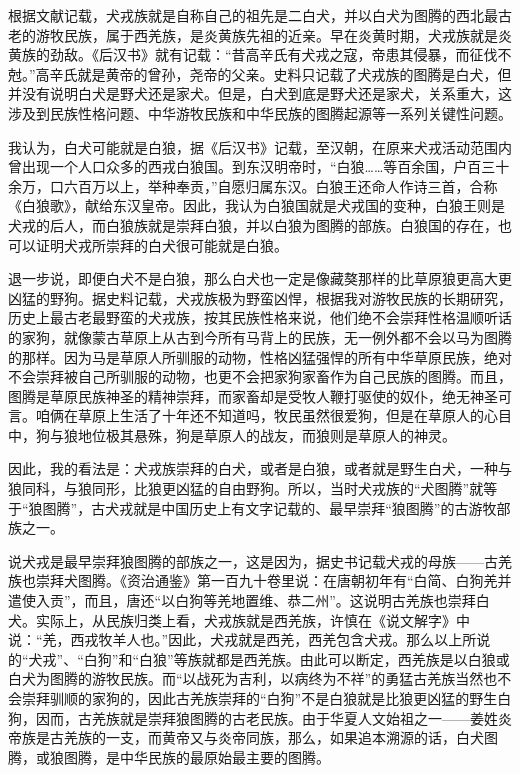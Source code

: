\par 根据文献记载，犬戎族就是自称自己的祖先是二白犬，并以白犬为图腾的西北最古老的游牧民族，属于西羌族，是炎黄族先祖的近亲。早在炎黄时期，犬戎族就是炎黄族的劲敌。《后汉书》就有记载：“昔高辛氏有犬戎之寇，帝患其侵暴，而征伐不尅。”高辛氏就是黄帝的曾孙，尧帝的父亲。史料只记载了犬戎族的图腾是白犬，但并没有说明白犬是野犬还是家犬。但是，白犬到底是野犬还是家犬，关系重大，这涉及到民族性格问题、中华游牧民族和中华民族的图腾起源等一系列关键性问题。
\par 我认为，白犬可能就是白狼，据《后汉书》记载，至汉朝，在原来犬戎活动范围内曾出现一个人口众多的西戎白狼国。到东汉明帝时，“白狼……等百余国，户百三十余万，口六百万以上，举种奉贡，”自愿归属东汉。白狼王还命人作诗三首，合称《白狼歌》，献给东汉皇帝。因此，我认为白狼国就是犬戎国的变种，白狼王则是犬戎的后人，而白狼族就是崇拜白狼，并以白狼为图腾的部族。白狼国的存在，也可以证明犬戎所崇拜的白犬很可能就是白狼。
\par 退一步说，即便白犬不是白狼，那么白犬也一定是像藏獒那样的比草原狼更高大更凶猛的野狗。据史料记载，犬戎族极为野蛮凶悍，根据我对游牧民族的长期研究，历史上最古老最野蛮的犬戎族，按其民族性格来说，他们绝不会崇拜性格温顺听话的家狗，就像蒙古草原上从古到今所有马背上的民族，无一例外都不会以马为图腾的那样。因为马是草原人所驯服的动物，性格凶猛强悍的所有中华草原民族，绝对不会崇拜被自己所驯服的动物，也更不会把家狗家畜作为自己民族的图腾。而且，图腾是草原民族神圣的精神崇拜，而家畜却是受牧人鞭打驱使的奴仆，绝无神圣可言。咱俩在草原上生活了十年还不知道吗，牧民虽然很爱狗，但是在草原人的心目中，狗与狼地位极其悬殊，狗是草原人的战友，而狼则是草原人的神灵。
\par 因此，我的看法是：犬戎族崇拜的白犬，或者是白狼，或者就是野生白犬，一种与狼同科，与狼同形，比狼更凶猛的自由野狗。所以，当时犬戎族的“犬图腾”就等于“狼图腾”，古犬戎就是中国历史上有文字记载的、最早崇拜“狼图腾”的古游牧部族之一。
\par 说犬戎是最早崇拜狼图腾的部族之一，这是因为，据史书记载犬戎的母族——古羌族也崇拜犬图腾。《资治通鉴》第一百九十卷里说：在唐朝初年有“白简、白狗羌并遣使入贡”，而且，唐还“以白狗等羌地置维、恭二州”。这说明古羌族也崇拜白犬。实际上，从民族归类上看，犬戎族就是西羌族，许慎在《说文解字》中说：“羌，西戎牧羊人也。”因此，犬戎就是西羌，西羌包含犬戎。那么以上所说的“犬戎”、“白狗”和“白狼”等族就都是西羌族。由此可以断定，西羌族是以白狼或白犬为图腾的游牧民族。而“以战死为吉利，以病终为不祥”的勇猛古羌族当然也不会崇拜驯顺的家狗的，因此古羌族崇拜的“白狗”不是白狼就是比狼更凶猛的野生白狗，因而，古羌族就是崇拜狼图腾的古老民族。由于华夏人文始祖之一——姜姓炎帝族是古羌族的一支，而黄帝又与炎帝同族，那么，如果追本溯源的话，白犬图腾，或狼图腾，是中华民族的最原始最主要的图腾。
